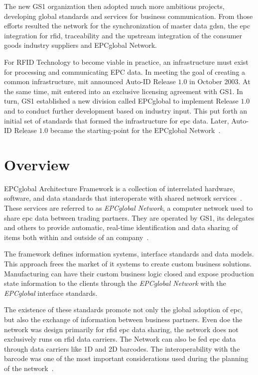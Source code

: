 The new GS1 organization then adopted much more ambitious projects, developing global standards and services for business communication.
From those efforts resulted the network for the synchronization of master data \ac{gdsn}, the \ac{epc} integration for \ac{rfid}, traceability and the upstream integration of the consumer goods industry suppliers and EPCglobal Network.

For RFID Technology to become viable in practice, an infrastructure must exist for processing and communicating EPC data. In meeting the goal of creating a common infrastructure, \ac{mit} announced Auto-ID Release $1.0$ in October 2003. At the same time, \ac{mit} entered into an exclusive licensing agreement with GS1.
In turn, GS1 established a new division called EPCglobal to implement Release $1.0$ and to conduct further development based on industry input. This put forth an initial set of standards that formed the infrastructure for \ac{epc} data. Later, Auto-ID Release $1.0$ became the starting-point for the EPCglobal Network~\cite{GlobalRFIDValue}.

\section{Overview}


EPCglobal Architecture Framework is a collection of interrelated hardware, software, and data standards that interoperate with shared network services~\cite{GS1EPCglobalArchitecture}.
These services are referred to as \emph{EPCglobal Network}, a computer network used to share \ac{epc} data between trading partners.
They are operated by GS1, its delegates and others to provide automatic, real-time identification and data sharing of items both within and outside of an company~\cite[p. 213]{lahiriRFIDSourcebook2005}.

The framework defines information systems, interface standards and data models. This approach frees the market of \ac{it} systems to create custom business solutions. Manufacturing can have their custom business logic closed and expose production state information to the clients through the \emph{EPCglobal Network} with the \emph{EPCglobal} interface standards.

The existence of these standards promote not only the global adoption of \ac{epc}, but also the exchange of information between business partners.
Even doe the network was design primarily for \ac{rfid} \ac{epc} data sharing, the network does not exclusively runs on \ac{rfid} data carriers. The Network can also be fed \ac{epc} data through data carriers like 1D and 2D barcodes. The interoperability with the barcode was one of the most important considerations used during the planning of the network~\cite{RFIDBarcodeInteroperability}.

